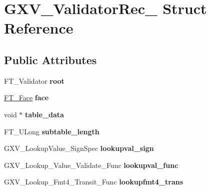 \hypertarget{struct_g_x_v___validator_rec__}{}\section{G\+X\+V\+\_\+\+Validator\+Rec\+\_\+ Struct Reference}
\label{struct_g_x_v___validator_rec__}
\subsection*{Public Attributes}
\begin{DoxyCompactItemize}
\item 
\mbox{\label{struct_g_x_v___validator_rec___a2a0e279d80fbadf4650451684a9cbc44}} 
F\+T\+\_\+\+Validator {\bfseries root}
\item 
\mbox{\label{struct_g_x_v___validator_rec___a9af04b6e46298908804d2c500529136e}} 
\hyperlink{struct_f_t___face_rec__}{F\+T\+\_\+\+Face} {\bfseries face}
\item 
\mbox{\label{struct_g_x_v___validator_rec___a5f6e15e04c9cbb6575225dd363d72ea6}} 
void $\ast$ {\bfseries table\+\_\+data}
\item 
\mbox{\label{struct_g_x_v___validator_rec___a7413e3a11db198863ae86ea307a5125a}} 
F\+T\+\_\+\+U\+Long {\bfseries subtable\+\_\+length}
\item 
\mbox{\label{struct_g_x_v___validator_rec___abb2e3fa544f110a96156fe7cd7a3cf61}} 
G\+X\+V\+\_\+\+Lookup\+Value\+\_\+\+Sign\+Spec {\bfseries lookupval\+\_\+sign}
\item 
\mbox{\label{struct_g_x_v___validator_rec___aa58a11411224dcd3b34dfeb806ca0921}} 
G\+X\+V\+\_\+\+Lookup\+\_\+\+Value\+\_\+\+Validate\+\_\+\+Func {\bfseries lookupval\+\_\+func}
\item 
\mbox{\label{struct_g_x_v___validator_rec___a24a5a6f331e73e813ca541a5c875acc3}} 
G\+X\+V\+\_\+\+Lookup\+\_\+\+Fmt4\+\_\+\+Transit\+\_\+\+Func {\bfseries lookupfmt4\+\_\+trans}
\item 

\end{DoxyCompactItemize}
